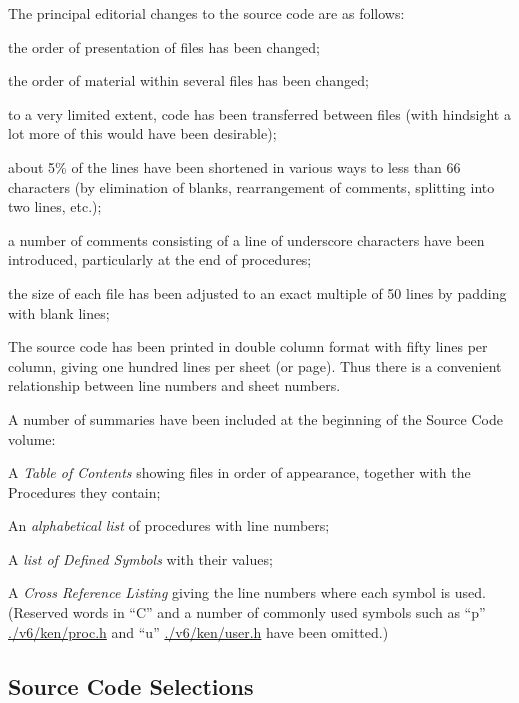 The principal editorial changes to the
source code are as follows:

\bi
\item the order of presentation of files
has been changed;

\item the order of material within
several files has been changed;

\item to a very limited extent, code has
been transferred between files
(with hindsight a lot more of this
would have been desirable);

\item about 5\% of the lines have been
shortened in various ways to less
than 66 characters (by elimination
of blanks, rearrangement of comments,
splitting into two lines, etc.);

\item a number of comments consisting of
a line of underscore characters
have been introduced, particularly
at the end of procedures;

\item the size of each file has been
adjusted to an exact multiple of
50 lines by padding with blank
lines;
\ei


The source code has been printed in
double column format with fifty lines
per column, giving one hundred lines
per sheet (or page). Thus there is a
convenient relationship between line
numbers and sheet numbers.

A number of summaries have been
included at the beginning of the Source
Code volume:

\bi
\item A {\it Table of Contents} showing files
in order of appearance, together
with the Procedures they contain;

\item An {\it alphabetical list} of procedures
with line numbers;

\item A {\it list of Defined Symbols} with
their values;

\item A {\it Cross Reference Listing} giving
the line numbers where each symbol
is used. (Reserved words in ``C''
and a number of commonly used symbols
such as ``p'' \url{./v6/ken/proc.h} and ``u'' \url{./v6/ken/user.h} have been
omitted.)
\ei

\subsection{Source Code Selections}

